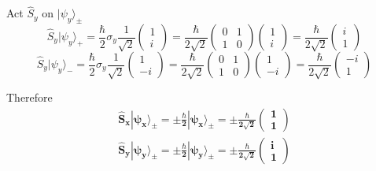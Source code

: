 \documentclass[12pt]{article}
\begin{document}
        Act $\hat{S}_y$ on $|\psi_y \rangle_\pm$
        \[
            \hat{S}_y|\psi_y\rangle_+ = \frac{\hbar}{2} \sigma_y \frac{1}{\sqrt{2}} \begin{pmatrix}
                1 \\ i
            \end{pmatrix} = \frac{\hbar}{2\sqrt{2}} \begin{pmatrix}
                0 & 1 \\
                1 & 0
            \end{pmatrix} \begin{pmatrix}
                1 \\ i
            \end{pmatrix} = \frac{\hbar}{2 \sqrt{2}} \begin{pmatrix}
                i \\ 1
            \end{pmatrix}
        \]
        \[
            \hat{S}_y|\psi_y\rangle_- = \frac{\hbar}{2} \sigma_y \frac{1}{\sqrt{2}} \begin{pmatrix}
                1 \\ -i
            \end{pmatrix} = \frac{\hbar}{2\sqrt{2}} \begin{pmatrix}
                0 & 1 \\
                1 & 0
            \end{pmatrix} \begin{pmatrix}
                1 \\ -i
            \end{pmatrix} = \frac{\hbar}{2 \sqrt{2}} \begin{pmatrix}
                -i \\ 1
            \end{pmatrix}
        \]

        Therefore
        \begin{align*}
            \boldsymbol{\boxed{\hat{S}_x|\psi_x\rangle_\pm = \pm \frac{\hbar}{2} |\psi_x\rangle_\pm = \pm \frac{\hbar}{2 \sqrt{2}}\begin{pmatrix}
                1 \\ 1
            \end{pmatrix}}} \\
            \boldsymbol{\boxed{\hat{S}_y|\psi_y\rangle_\pm = \pm \frac{\hbar}{2} |\psi_y\rangle_\pm = \pm \frac{\hbar}{2 \sqrt{2}}\begin{pmatrix}
                i \\ 1
            \end{pmatrix}}}
        \end{align*}
    
\end{document}
